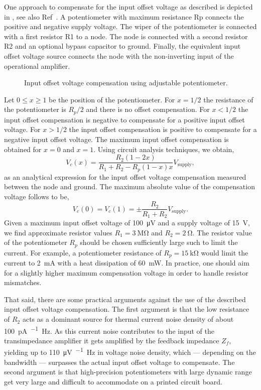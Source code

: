 One approach to compensate for the input offset voltage as described is depicted in , see also Ref~\cite[p.~54]{Jung05}.
A potentiometer with maximum resistance Rp connects the positive and negative supply voltage.
The wiper of the potentiometer is connected with a first resistor R1 to a node.
The node is connected with a second resistor R2 and an optional bypass capacitor to ground.
Finally, the equivalent input offset voltage source connects the node with the non-inverting input of the operational amplifier.
\begin{figure}[H]
	\centering
	
	\caption{Input offset voltage compensation using adjustable potentiometer.}\label{fig:input_offset_voltage_compensation}
\end{figure}
Let $0\leq x\geq1$ be the position of the potentiometer.
For $x=1/2$ the resistance of the potentiometer is $R_p/2$ and there is no offset compensation.
For $x<1/2$ the input offset compensation is negative to compensate for a positive input offset voltage.
For $x>1/2$ the input offset compensation is positive to compensate for a negative input offset voltage.
The maximum input offset compensation is obtained for $x=0$ and $x=1$.
Using circuit analysis techniques, we obtain,
\begin{equation}
	V_c(x)=\frac{R_2(1-2x)}{R_1+R_2-R_p(1-x)x}V_\text{supply},
\end{equation}
as an analytical expression for the input offset voltage compensation measured between the node and ground.
The maximum absolute value of the compensation voltage follows to be,
\begin{equation}
	V_c(0)=V_c(1)=\pm\frac{R_2}{R_1+R_2}V_\text{supply}.
\end{equation}
Given a maximum input offset voltage of \SI{100}{\micro\volt} and a supply voltage of \SI{15}{\volt}, we find approximate resistor values $R_1=\SI{3}{\mega\ohm}$ and $R_2=\SI{2}{\ohm}$.
The resistor value of the potentiometer $R_p$ should be chosen sufficiently large such to limit the current.
For example, a potentiometer resistance of $R_p=\SI{15}{\kilo\ohm}$ would limit the current to \SI{2}{\milli\ampere} with a heat dissipation of \SI{60}{\milli\watt}.
In practice, one should aim for a slightly higher maximum compensation voltage in order to handle resistor mismatches.

That said, there are some practical arguments against the use of the described input offset voltage compensation.
The first argument is that the low resistance of $R_2$ acts as a dominant source for thermal current noise density of about \SI{100}{\pico\ampere\per\sqrt\hertz}.
As this current noise contributes to the input of the transimpedance amplifier it gets amplified by the feedback impedance $Z_f$, yielding up to \SI{110}{\micro\volt\per\sqrt\hertz} in voltage noise density, which --- depending on the bandwidth --- surpasses the actual input offset voltage to compensate.
The second argument is that high-precision potentiometers with large dynamic range get very large and difficult to accommodate on a printed circuit board.

